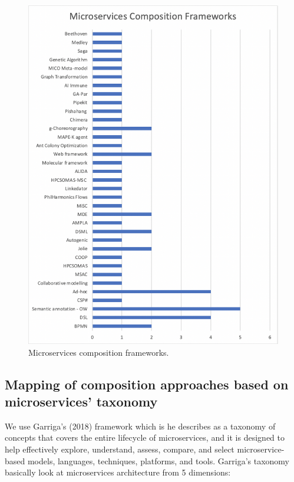 \documentclass{article}
\begin{document}
\begin{multicols}{2}
\begin{figure}[htb!]
 \centerline{\includegraphics[scale=0.60]{mscompframw.png}}
  \caption{Microservices composition frameworks.}
  \label{fig}
\end{figure}

\subsection{Mapping of composition approaches based on microservices' taxonomy}

We use Garriga's (2018) framework which is he describes as a taxonomy of concepts that covers the entire lifecycle of microservices, and it is designed to help effectively explore, understand, assess, compare, and select microservice-based models, languages, techniques, platforms, and tools. Garriga's taxonomy basically look at microservices architecture from 5 dimensions: 


\end{multicols}
\end{document}
